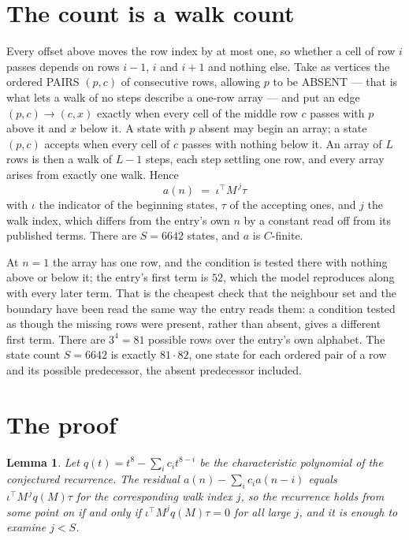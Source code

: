 \documentclass[11pt,a4paper]{article}
\theoremstyle{plain}
\newtheorem{lemma}[theorem]{Lemma}
\theoremstyle{definition}
\begin{document}
\section{The count is a walk count}

Every offset above moves the row index by at most one, so whether a cell of row $i$ passes
depends on rows $i-1$, $i$ and $i+1$ and nothing else. Take as vertices the ordered PAIRS
$(p,c)$ of consecutive rows, allowing $p$ to be ABSENT --- that is what lets a walk of no steps
describe a one-row array --- and put an edge $(p,c)\to(c,x)$ exactly when every cell of the
middle row $c$ passes with $p$ above it and $x$ below it. A state with $p$ absent may begin an
array; a state $(p,c)$ accepts when every cell of $c$ passes with nothing below it. An array of
$L$ rows is then a walk of $L-1$ steps, each step settling one row, and every array arises from
exactly one walk. Hence
\[
a(n)\;=\;\iota^{\!\top}M^{\,j}\tau
\]
with $\iota$ the indicator of the beginning states, $\tau$ of the accepting ones, and $j$ the
walk index, which differs from the entry's own $n$ by a constant read off from its published
terms. There are $S=6642$ states, and $a$ is $C$-finite.

At $n=1$ the array has one row, and
the condition is tested there with nothing above or below it; the entry's first term is
$52$, which the model reproduces along with every later term. That is the cheapest check
that the neighbour set and the boundary have been read the same way the entry reads them: a
condition tested as though the missing rows were present, rather than absent, gives a different
first term. There are $3^{4}=81$ possible rows over the entry's own alphabet. The state count $S=6642$ is exactly $81\cdot82$,
one state for each ordered pair of a row and its possible predecessor, the absent predecessor
included.

\section{The proof}

\begin{lemma}\label{lem:crit}
Let $q(t)=t^{8}-\sum_i c_it^{8-i}$ be the characteristic polynomial of the
conjectured recurrence. The residual $a(n)-\sum_ic_ia(n-i)$ equals
$\iota^{\!\top}M^{\,j}q(M)\tau$ for the corresponding walk index $j$, so the recurrence
holds from some point on if and only if $\iota^{\!\top}M^{j}q(M)\tau=0$ for all large $j$,
and it is enough to examine $j<S$.
\end{lemma}
\end{document}
